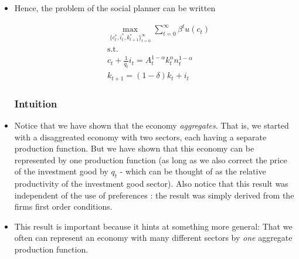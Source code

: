 \documentclass{scrartcl}
\begin{document}
\begin{itemize}
\item Hence, the problem of the social planner can be written 
		
		\begin{align}
		&\max_{\{{c_t^*,i_t^*, k_{t+1}^* }\}_{t=0}^{\infty}} {\sum_{t=0}^{\infty} \beta^t u(c_t)} \\
		&\text{s.t. } \nonumber \\
		&c_t+\frac{1}{q_t} i_t=A_t^{1-\alpha} k_t^{\alpha} n_t^{1-\alpha} \nonumber \\
		&k_{t+1}=(1-\delta)k_t+i_t \nonumber
		\end{align}
	
	\subsubsection*{Intuition}
	
\item Notice that we have shown that the economy \emph{aggregates}. That is, we started with a disaggreated economy with two sectors,  each having a separate production function. But we have shown that this economy can be represented by one production function (as long as we also correct the price of the investment good by $q_t$ - which can be thought of as the relative productivity of the investment good sector). Also notice that this result was independent of the use of preferences : the result was simply derived from the firms first order conditions.

\item This result is important because it hints at something more general: That we often can represent an economy with many different sectors by \emph{one} aggregate production function.
	
\end{itemize}
\end{document}

